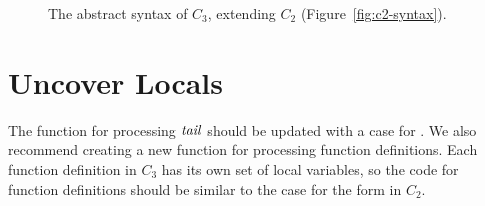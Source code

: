 \documentclass[11pt]{book}
\newcommand{\gray}[1]{{\color{gray} #1}}
\begin{document}
\begin{figure}[tp]
\fbox{
\begin{minipage}{0.96\textwidth}
    \small
\[
\begin{array}{lcl}
\Atm &::=& \gray{ \INT{\Int} \mid \VAR{\Var} \mid \BOOL{\itm{bool}} }\\
\itm{cmp} &::= & \gray{  \key{eq?} \mid \key{<} } \\
\Exp &::= & \gray{ \Atm \mid \READ{} } \\
   &\mid& \gray{ \NEG{\Atm} \mid \ADD{\Atm}{\Atm} }\\
   &\mid& \gray{ \UNIOP{\key{not}}{\Atm} \mid \BINOP{\itm{cmp}}{\Atm}{\Atm}  } \\
   &\mid& \gray{ (\key{Allocate} \,\itm{int}\,\itm{type}) } \\
   &\mid& \gray{ \BINOP{\key{'vector-ref}}{\Atm}{\INT{\Int}}  }\\
   &\mid& \gray{ (\key{Prim}~\key{'vector-set!}\,(\key{list}\,\Atm\,\INT{\Int}\,\Atm)) }\\
   &\mid& \gray{ (\key{GlobalValue} \,\Var) \mid (\key{Void}) }\\
   &\mid& \FUNREF{\itm{label}} \mid \CALL{\Atm}{\Atm\ldots} \\
\Stmt &::=& \gray{ \ASSIGN{\VAR{\Var}}{\Exp} 
       \mid (\key{Collect} \,\itm{int}) } \\
\Tail &::= & \gray{ \RETURN{\Exp} \mid \SEQ{\Stmt}{\Tail} 
       \mid \GOTO{\itm{label}} } \\
    &\mid& \gray{ \IFSTMT{\BINOP{\itm{cmp}}{\Atm}{\Atm}}{\GOTO{\itm{label}}}{\GOTO{\itm{label}}}  }\\
    &\mid& \TAILCALL{\Atm}{\Atm\ldots} \\
\Def &::=& \DEF{\itm{label}}{([\Var\key{:}\Type]\ldots)}{\Type}{((\itm{label}\,\key{.}\,\Tail)\ldots)}\\
C_3 & ::= & \PROGRAMDEFS{\itm{info}}{(\Def\ldots)} 
\end{array}
\]
\end{minipage}
}
\caption{The abstract syntax of $C_3$, extending $C_2$ (Figure~\ref{fig:c2-syntax}).}
\label{fig:c3-syntax}
\end{figure}

\section{Uncover Locals}
\label{sec:uncover-locals-r4}

The function for processing $\mathit{tail}$ should be updated with a case for
. We also recommend creating a new function for
processing function definitions. Each function definition in $C_3$ has
its own set of local variables, so the code for function definitions
should be similar to the case for the  form in $C_2$.
\end{document}
